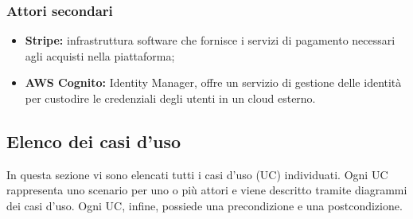 \subsubsection{Attori secondari}
\begin{itemize}
\item \textbf{Stripe:} infrastruttura software che fornisce i servizi di pagamento necessari agli acquisti nella piattaforma;
\item \textbf{AWS Cognito:} Identity Manager, offre un servizio di gestione delle identità per custodire le credenziali degli utenti in un cloud esterno.
\end{itemize}
\subsection{Elenco dei casi d'uso}
In questa sezione vi sono elencati tutti i casi d'uso (UC) individuati. Ogni UC rappresenta uno scenario per uno o più attori e viene descritto tramite diagrammi dei casi d'uso. Ogni UC, infine, possiede una precondizione e una postcondizione. \\










